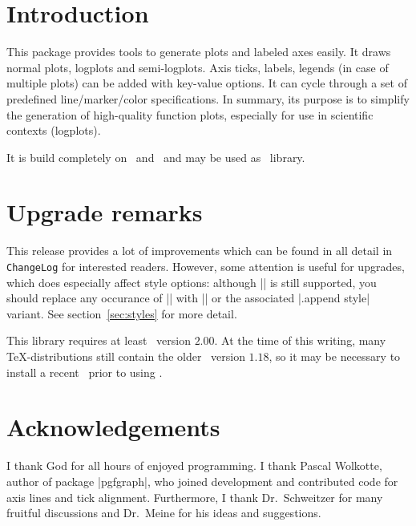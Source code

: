 \maketitle
\begin{abstract}%
\PGFPlots\ draws high--quality function plots in normal or logarithmic scaling with a user-friendly interface directly in \TeX. The user supplies axis labels, legend entries and the plot coordinates for one or more plots and \PGFPlots\ applies axis scaling, computes any logarithms and axis ticks and draws the plots, supporting line plots, piecewise constant plots, bar plots and area plots. It is based on Till Tantau's package \PGF/\Tikz.
\end{abstract}
\tableofcontents
\section{Introduction}
This package provides tools to generate plots and labeled axes easily. It draws normal plots, logplots and semi-logplots. Axis ticks, labels, legends (in case of multiple plots) can be added with key-value options. It can cycle through a set of predefined line/marker/color specifications. In summary, its purpose is to simplify the generation of high-quality function plots, especially for use in scientific contexts (logplots).

It is build completely on \Tikz\ and \PGF\ and may be used as \Tikz\ library. 

\section{Upgrade remarks}
This release provides a lot of improvements which can be found in all detail in \texttt{ChangeLog} for interested readers. However, some attention is useful for upgrades, which does especially affect style options: although |\tikzstyle| is still supported, you should replace any occurance of |\tikzstyle| with || or the associated |.append style| variant. See section~\ref{sec:styles} for more detail.

This library requires at least \PGF\ version $2.00$. At the time of this writing, many \TeX-distributions still contain the older \PGF\ version $1.18$, so it may be necessary to install a recent \PGF\ prior to using \PGFPlots.

\section{Acknowledgements}
I thank God for all hours of enjoyed programming. I thank Pascal Wolkotte, author of package |pgfgraph|, who joined development and contributed code for axis lines and tick alignment. Furthermore, I thank Dr.~Schweitzer for many fruitful discussions and Dr.~Meine for his ideas and suggestions.

